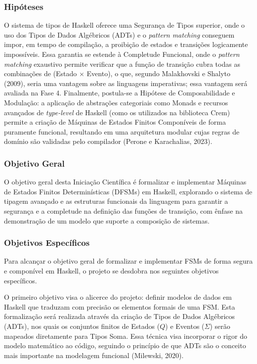 \documentclass[12pt,a4paper]{article}
\begin{document}
\subsubsection{Hipóteses}
O sistema de tipos de Haskell oferece uma Segurança de Tipos superior, onde o uso dos Tipos de Dados Algébricos (ADTs) e o \textit{pattern matching} conseguem impor, em tempo de compilação, a proibição de estados e transições logicamente impossíveis. Essa garantia se estende à Completude Funcional, onde o \textit{pattern matching} exaustivo permite verificar que a função de transição cubra todas as combinações de (Estado $\times$ Evento), o que, segundo Malakhovski e Shalyto (2009), seria uma vantagem sobre as linguagens imperativas; essa vantagem será avaliada na Fase 4. Finalmente, postula-se a Hipótese de Composabilidade e Modulação: a aplicação de abstrações categoriais como Monads e recursos avançados de \textit{type-level} de Haskell (como os utilizados na biblioteca Crem) permite a criação de Máquinas de Estados Finitos Componíveis de forma puramente funcional, resultando em uma arquitetura modular cujas regras de domínio são validadas pelo compilador (Perone e Karachalias, 2023).

\subsubsection{Objetivo Geral}
O objetivo geral desta Iniciação Científica é formalizar e implementar Máquinas de Estados Finitos Determinísticas (DFSMs) em Haskell, explorando o sistema de tipagem avançado e as estruturas funcionais da linguagem para garantir a segurança e a completude na definição das funções de transição, com ênfase na demonstração de um modelo que suporte a composição de sistemas.

\subsubsection{Objetivos Específicos}

Para alcançar o objetivo geral de formalizar e implementar FSMs de forma segura e componível em Haskell, o projeto se desdobra nos seguintes objetivos específicos.

O primeiro objetivo visa o alicerce do projeto: definir modelos de dados em Haskell que traduzam com precisão os elementos formais de uma FSM. Esta formalização será realizada através da criação de Tipos de Dados Algébricos (ADTs), nos quais os conjuntos finitos de Estados ($Q$) e Eventos ($\Sigma$) serão mapeados diretamente para Tipos Soma. Essa técnica visa incorporar o rigor do modelo matemático ao código, seguindo o princípio de que ADTs são o conceito mais importante na modelagem funcional (Milewski, 2020).
\end{document}
